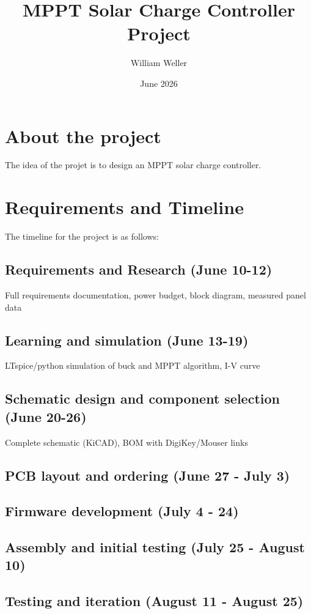 \documentclass{article}
\title{MPPT Solar Charge Controller Project}
\author{William Weller}
\date{June 2026}
\begin{document}
\maketitle

\section{About the project}
The idea of the projet is to design an MPPT solar charge controller.

\section{Requirements and Timeline}
The timeline for the project is as follows:
\subsection{Requirements and Research (June 10-12)}
Full requirements documentation, power budget, block diagram, measured panel data
\subsection{Learning and simulation (June 13-19)}
LTspice/python simulation of buck and MPPT algorithm, I-V curve
\subsection{Schematic design and component selection (June 20-26)}
Complete schematic (KiCAD), BOM with DigiKey/Mouser links
\subsection{PCB layout and ordering (June 27 - July 3)}
\subsection{Firmware development (July 4 - 24)}
\subsection{Assembly and initial testing (July 25 - August 10)}
\subsection{Testing and iteration (August 11 - August 25)}
\end{document}
